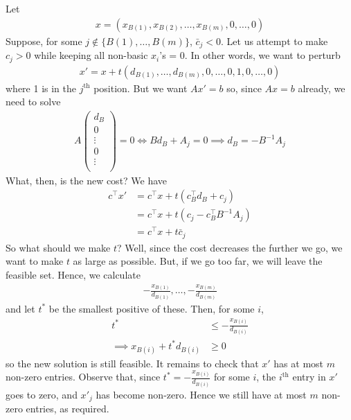 \documentclass{../../template/note}
\begin{document}
    Let
    \begin{align*}
        x = (x_{B(1)}, x_{B(2)}, \dots, x_{B(m)}, 0, \dots, 0)
    \end{align*}
    Suppose, for some $j \notin \{B(1), \dots, B(m)\}$, $\bar c_j < 0$. Let us attempt to make $c_j > 0$ while keeping all non-basic $x_i$'s = 0. In other words, we want to perturb
    \begin{align*}
        x' = x + t(d_{B(1)}, \dots, d_{B(m)}, 0, \dots, 0, 1, 0, \dots, 0)
    \end{align*}
    where 1 is in the $j^\text{th}$ position. But we want $Ax' = b$ so, since $Ax = b$ already, we need to solve
    \begin{align*}
        A \begin{pmatrix}
            d_B \\
            0 \\
            \vdots \\
            0 \\
            \vdots \\
        \end{pmatrix} = 0 \iff Bd_B + A_j = 0 \implies d_B = -B^{-1}A_j
    \end{align*}
    What, then, is the new cost? We have
    \begin{align*}
        c^\intercal x' &= c^\intercal x + t(c_B^\intercal d_B + c_j) \\
        &= c^\intercal x + t(c_j - c_B^\intercal B^{-1}A_j) \\
        &= c^\intercal x + t \bar c_j
    \end{align*}
    So what should we make $t$? Well, since the cost decreases the further we go, we want to make $t$ as large as possible. But, if we go too far, we will leave the feasible set. Hence, we calculate
    \begin{align*}
        -\frac{x_{B(1)}}{d_{B(1)}}, \dots, -\frac{x_{B(m)}}{d_{B(m)}}
    \end{align*}
    and let $t^*$ be the smallest positive of these. Then, for some $i$,
    \begin{align*}
        t^* &\leq -\frac{x_{B(i)}}{d_{B(i)}} \\
        \implies x_{B(i)} + t^*d_{B(i)} &\geq 0
    \end{align*}
    so the new solution is still feasible. It remains to check that $x'$ has at most $m$ non-zero entries. Observe that, since $t^* = -\frac{x_{B(i)}}{d_{B(i)}}$ for some $i$, the $i^\text{th}$ entry in $x'$ goes to zero, and $x'_j$ has become non-zero. Hence we still have at most $m$ non-zero entries, as required.
\end{document}
